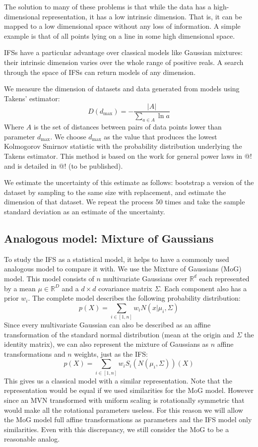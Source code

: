 \documentclass[10pt,a4paper,oneside]{article}
\theoremstyle{definition}
\begin{document}
The solution to many of these problems is that while the data has a high-dimensional representation, it has a low intrinsic dimension. That is, it can be mapped to a low dimensional space without any loss of information. A simple example is that of all points lying on a line in some high dimensional space. 

IFSs have a particular advantage over classical models like Gaussian mixtures: their intrinsic dimension varies over the whole range of positive reals. A search through the space of IFSs can return models of any dimension.

We measure the dimension of datasets and data generated from models using Takens' estimator:
\[
D(d_{\mbox{max}}) = -\frac{|A|}{\sum_{a \in A} \ln a} 
\]
Where $A$ is the set of distances between pairs of data points lower than parameter $d_{\mbox{max}}$. We choose $d_{\mbox{max}}$ as the value that produces the lowest Kolmogorov Smirnov statistic with the probability distribution underlying the Takens estimator. This method is based on the work for general power laws in @! and is detailed in @! (to be published). 

We estimate the uncertainty of this estimate as follows: bootstrap a version of the dataset by sampling to the same size with replacement, and estimate the dimension of that dataset. We repeat the process 50 times and take the sample standard deviation as an estimate of the uncertainty.

\subsection*{Analogous model: Mixture of Gaussians}

To study the IFS as a statistical model, it helps to have a commonly used analogous model to compare it with. We use the Mixture of Gaussians (MoG) model. This model consists of $n$ multivariate Gaussians over ${\mathbb R}^d$ each represented by a mean $\mu \in {\mathbb R}^D$ and a $d \times d$ covariance matrix $\Sigma$. Each component also has a prior $w_i$. The complete model describes the following probability distribution:
\[
p(X) = \sum_{i \in [1,n]} w_i N(x|\mu_i, \Sigma)
\]
Since every multivariate Gaussian can also be described as an affine transformation of the standard normal distribution (mean at the origin and $\Sigma$ the identity matrix), we can also represent the mixture of Gaussians as $n$ affine transformations and $n$ weights, just as the IFS:
\[
p(X) = \sum_{i \in [1,n]} w_i S_i(N(\mu_i, \Sigma))(X)
\]
This gives us a classical model with a similar representation. Note that the representation would be equal if we used similarities for the MoG model. However since an MVN transformed with uniform scaling is rotationally symmetric that would make all the rotational parameters useless. For this reason we will allow the MoG model full affine transformations as parameters and the IFS model only similarities. Even with this discrepancy, we still consider the MoG to be a reasonable analog.
\end{document}
